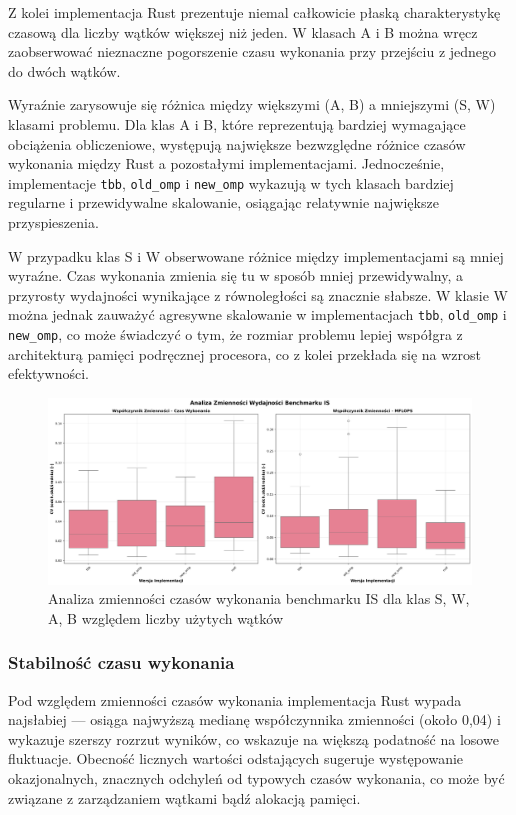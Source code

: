 Z kolei implementacja Rust prezentuje niemal całkowicie płaską charakterystykę czasową dla liczby wątków większej niż jeden. W klasach A i B można wręcz zaobserwować nieznaczne pogorszenie czasu wykonania przy przejściu z jednego do dwóch wątków.

Wyraźnie zarysowuje się różnica między większymi (A, B) a mniejszymi (S, W) klasami problemu. Dla klas A i B, które reprezentują bardziej wymagające obciążenia obliczeniowe, występują największe bezwzględne różnice czasów wykonania między Rust a pozostałymi implementacjami. Jednocześnie, implementacje \texttt{tbb}, \texttt{old\_omp} i \texttt{new\_omp} wykazują w tych klasach bardziej regularne i przewidywalne skalowanie, osiągając relatywnie największe przyspieszenia.

W przypadku klas S i W obserwowane różnice między implementacjami są mniej wyraźne. Czas wykonania zmienia się tu w sposób mniej przewidywalny, a przyrosty wydajności wynikające z równoległości są znacznie słabsze. W klasie W można jednak zauważyć agresywne skalowanie w implementacjach \texttt{tbb}, \texttt{old\_omp} i \texttt{new\_omp}, co może świadczyć o tym, że rozmiar problemu lepiej współgra z architekturą pamięci podręcznej procesora, co z kolei przekłada się na wzrost efektywności.

\begin{figure}[H]
    \centering
    \includegraphics[width=\textwidth]{analiza/images/parallel/is/x86/is_analiza_zmiennosci.png}
    \caption{Analiza zmienności czasów wykonania benchmarku IS dla klas S, W, A, B względem liczby użytych wątków}
    \label{is_analiza_zmiennosci_x86}
\end{figure}
\subsubsection{Stabilność czasu wykonania}
Pod względem zmienności czasów wykonania implementacja Rust wypada najsłabiej — osiąga najwyższą medianę współczynnika zmienności (około 0,04) i wykazuje szerszy rozrzut wyników, co wskazuje na większą podatność na losowe fluktuacje. Obecność licznych wartości odstających sugeruje występowanie okazjonalnych, znacznych odchyleń od typowych czasów wykonania, co może być związane z zarządzaniem wątkami bądź alokacją pamięci.

